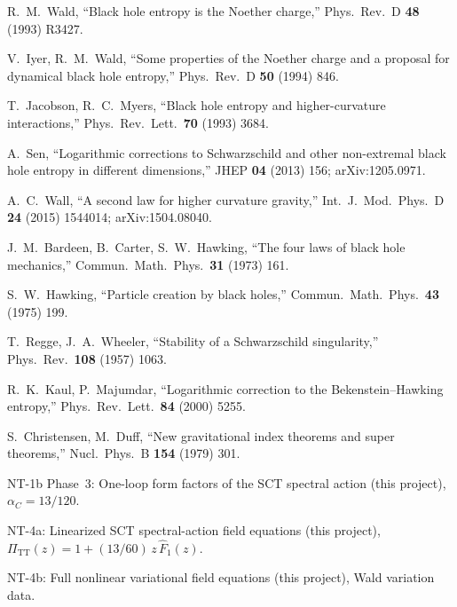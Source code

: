 \documentclass[11pt,a4paper]{article}
\newcommand{\PiTT}{\Pi_{\mathrm{TT}}}
\theoremstyle{plain}
\theoremstyle{definition}
\begin{document}
\begin{enumerate}[label={[\arabic*]}, nosep, leftmargin=2em]
  \item R.~M.~Wald, ``Black hole entropy is the Noether charge,''
    Phys.\ Rev.\ D \textbf{48} (1993) R3427.
  \item V.~Iyer, R.~M.~Wald, ``Some properties of the Noether charge and a
    proposal for dynamical black hole entropy,''
    Phys.\ Rev.\ D \textbf{50} (1994) 846.
  \item T.~Jacobson, R.~C.~Myers, ``Black hole entropy and higher-curvature
    interactions,'' Phys.\ Rev.\ Lett.\ \textbf{70} (1993) 3684.
  \item A.~Sen, ``Logarithmic corrections to Schwarzschild and other
    non-extremal black hole entropy in different dimensions,''
    JHEP \textbf{04} (2013) 156; arXiv:1205.0971.
  \item A.~C.~Wall, ``A second law for higher curvature gravity,''
    Int.\ J.\ Mod.\ Phys.\ D \textbf{24} (2015) 1544014; arXiv:1504.08040.
  \item J.~M.~Bardeen, B.~Carter, S.~W.~Hawking, ``The four laws of black
    hole mechanics,'' Commun.\ Math.\ Phys.\ \textbf{31} (1973) 161.
  \item S.~W.~Hawking, ``Particle creation by black holes,''
    Commun.\ Math.\ Phys.\ \textbf{43} (1975) 199.
  \item T.~Regge, J.~A.~Wheeler, ``Stability of a Schwarzschild singularity,''
    Phys.\ Rev.\ \textbf{108} (1957) 1063.
  \item R.~K.~Kaul, P.~Majumdar, ``Logarithmic correction to the
    Bekenstein--Hawking entropy,''
    Phys.\ Rev.\ Lett.\ \textbf{84} (2000) 5255.
  \item S.~Christensen, M.~Duff, ``New gravitational index theorems and
    super theorems,'' Nucl.\ Phys.\ B \textbf{154} (1979) 301.
  \item NT-1b Phase~3: One-loop form factors of the SCT spectral action
    (this project), $\alpha_C = 13/120$.
  \item NT-4a: Linearized SCT spectral-action field equations
    (this project), $\PiTT(z) = 1 + (13/60)\,z\,\hat{F}_1(z)$.
  \item NT-4b: Full nonlinear variational field equations
    (this project), Wald variation data.
\end{enumerate}
\end{document}
